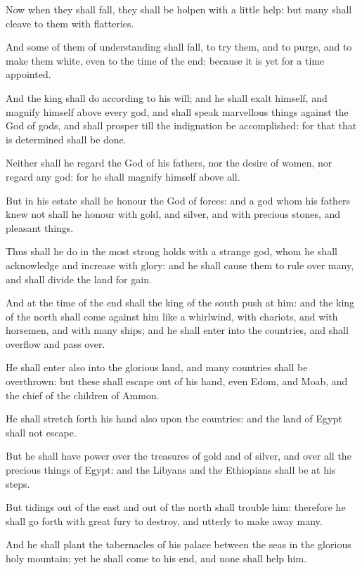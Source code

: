 \verse Now when they shall fall, they shall be holpen with a little help: but many shall cleave to them with flatteries.

\verse And some of them of understanding shall fall, to try them, and to purge, and to make them white, even to the time of the end: because it is yet for a time appointed.

\verse And the king shall do according to his will; and he shall exalt himself, and magnify himself above every god, and shall speak marvellous things against the God of gods, and shall prosper till the indignation be accomplished: for that that is determined shall be done.

\verse Neither shall he regard the God of his fathers, nor the desire of women, nor regard any god: for he shall magnify himself above all.

\verse But in his estate shall he honour the God of forces: and a god whom his fathers knew not shall he honour with gold, and silver, and with precious stones, and pleasant things.

\verse Thus shall he do in the most strong holds with a strange god, whom he shall acknowledge and increase with glory: and he shall cause them to rule over many, and shall divide the land for gain.

\verse And at the time of the end shall the king of the south push at him: and the king of the north shall come against him like a whirlwind, with chariots, and with horsemen, and with many ships; and he shall enter into the countries, and shall overflow and pass over.

\verse He shall enter also into the glorious land, and many countries shall be overthrown: but these shall escape out of his hand, even Edom, and Moab, and the chief of the children of Ammon.

\verse He shall stretch forth his hand also upon the countries: and the land of Egypt shall not escape.

\verse But he shall have power over the treasures of gold and of silver, and over all the precious things of Egypt: and the Libyans and the Ethiopians shall be at his steps.

\verse But tidings out of the east and out of the north shall trouble him: therefore he shall go forth with great fury to destroy, and utterly to make away many.

\verse And he shall plant the tabernacles of his palace between the seas in the glorious holy mountain; yet he shall come to his end, and none shall help him.


